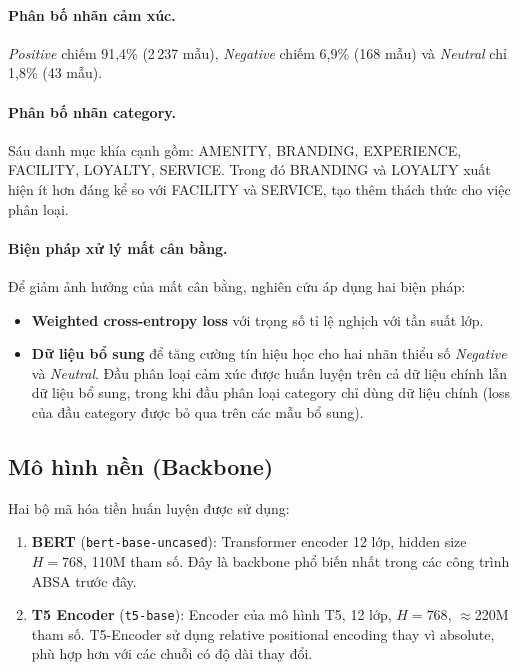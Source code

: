 \paragraph{Phân bố nhãn cảm xúc.}
\textit{Positive} chiếm 91,4\% (2\,237 mẫu), \textit{Negative} chiếm
6,9\% (168 mẫu) và \textit{Neutral} chỉ 1,8\% (43 mẫu).

\paragraph{Phân bố nhãn category.}
Sáu danh mục khía cạnh gồm: AMENITY, BRANDING, EXPERIENCE, FACILITY,
LOYALTY, SERVICE. Trong đó BRANDING và LOYALTY xuất hiện ít hơn đáng kể
so với FACILITY và SERVICE, tạo thêm thách thức cho việc phân loại.

\paragraph{Biện pháp xử lý mất cân bằng.}
Để giảm ảnh hưởng của mất cân bằng, nghiên cứu áp dụng hai biện pháp:
\begin{itemize}
    \item \textbf{Weighted cross-entropy loss} với trọng số tỉ lệ nghịch
    với tần suất lớp.
    \item \textbf{Dữ liệu bổ sung} để tăng cường tín hiệu học cho hai nhãn thiểu số
    \textit{Negative} và \textit{Neutral}. Đầu phân loại cảm xúc được
    huấn luyện trên cả dữ liệu chính lẫn dữ liệu bổ sung, trong khi đầu
    phân loại category chỉ dùng dữ liệu chính (loss của đầu category được
    bỏ qua trên các mẫu bổ sung).
\end{itemize}
\subsection{Mô hình nền (Backbone)}

Hai bộ mã hóa tiền huấn luyện được sử dụng:
\begin{enumerate}
  \item \textbf{BERT} (\texttt{bert-base-uncased}): Transformer encoder
        12 lớp, hidden size $H=768$, 110M tham số. Đây là backbone phổ
        biến nhất trong các công trình ABSA trước đây.
  \item \textbf{T5 Encoder} (\texttt{t5-base}): Encoder của mô hình T5,
        12 lớp, $H=768$, $\approx$220M tham số. T5-Encoder sử dụng
        relative positional encoding thay vì absolute, phù hợp hơn
        với các chuỗi có độ dài thay đổi.
\end{enumerate}

